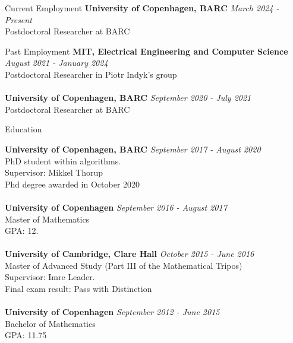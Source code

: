 \documentclass{resume} %
\begin{document}


\begin{rSection}{Current Employment}
{\bf University of Copenhagen, BARC} \hfill {\em March 2024 - Present} 
\\ Postdoctoral Researcher at BARC


\end{rSection}

\begin{rSection}{Past Employment}
{\bf MIT, Electrical Engineering and Computer Science} \hfill {\em August 2021 - January 2024} 
\\ Postdoctoral Researcher in Piotr Indyk's group \\ \\
{\bf University of Copenhagen, BARC} \hfill {\em September 2020 - July 2021} 
\\ Postdoctoral Researcher at BARC


\end{rSection}



\begin{rSection}{Education}

{\bf University of Copenhagen, BARC} \hfill {\em September 2017 - August 2020} 
\\ PhD student within algorithms. \\Supervisor: Mikkel Thorup
\\ Phd degree awarded in October 2020\\
\\{\bf University of Copenhagen} \hfill {\em September 2016 - August 2017}  
\\ Master of Mathematics 
\\ GPA: 12. \\
\\{\bf University of Cambridge, Clare Hall} \hfill {\em October 2015 - June 2016} 
\\ Master of Advanced Study (Part III of the Mathematical Tripos)
\\ Supervisor: Imre Leader. 
\\ Final exam result: Pass with Distinction \\
\\{\bf University of Copenhagen} \hfill {\em September 2012 - June 2015} 
\\ Bachelor of Mathematics
\\ GPA: 11.75 
\end{rSection}
\end{document}

